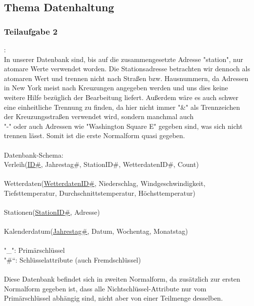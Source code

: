 \documentclass[a4paper,12pt]{article}
\begin{document}
\subsection{Thema Datenhaltung} 
\subsubsection{Teilaufgabe 2}:\\ In unserer Datenbank sind, bis auf die zusammengesetzte Adresse "station", nur atomare Werte verwendet worden. Die Stationsadresse betrachten wir dennoch als atomaren Wert und trennen nicht nach Straßen bzw.  Hausnummern, da Adressen in New York meist nach Kreuzungen angegeben werden und uns dies keine weitere Hilfe bezüglich der Bearbeitung liefert. Außerdem wäre es auch schwer eine einheitliche Trennung zu finden, da hier nicht immer "\&" als Trennzeichen der Kreuzungsstraßen verwendet wird, sondern manchmal auch \\"-" oder auch Adressen wie "Washington Square E" gegeben sind, was sich nicht trennen lässt. Somit ist die erste Normalform quasi gegeben. \\ \\
Datenbank-Schema:\\
Verleih(\uline{ID\#}, Jahrestag\#, StationID\#, WetterdatenID\#, Count)\\ \\
Wetterdaten(\uline{WetterdatenID\#}, Niederschlag, Windgeschwindigkeit, Tiefsttemperatur, Durchschnittstemperatur, Höchsttemperatur)\\ \\
Stationen(\uline{StationID\#}, Adresse)\\ \\
Kalenderdatum(\uline{Jahrestag\#}, Datum, Wochentag, Monatstag)\\ \\
"\_": Primärschlüssel\\
"\#“: Schlüsselattribute (auch Fremdschlüssel)\\ \\
Diese Datenbank befindet sich in zweiten Normalform, da zusätzlich zur ersten Normalform gegeben ist, dass alle Nichtschlüssel-Attribute nur vom Primärschlüssel abhängig sind, nicht aber von einer Teilmenge desselben. 
\\
\end{document}
